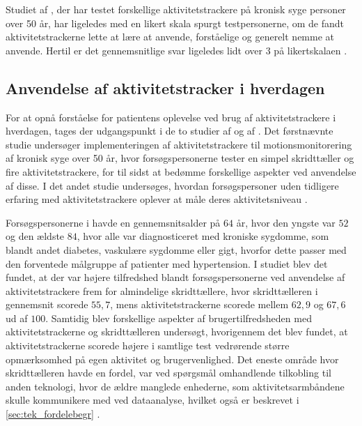 Studiet af \citeauthor{mercer2016}, der har testet forskellige aktivitetstrackere på kronisk syge personer over 50 år, har ligeledes med en likert skala spurgt testpersonerne, om de fandt aktivitetstrackerne lette at lære at anvende, forståelige og generelt nemme at anvende. Hertil er det gennemsnitlige svar ligeledes lidt over 3 på likertskalaen \citep{mercer2016}. 

\subsection{Anvendelse af aktivitetstracker i hverdagen} \label{sec:anvendelse}

For at opnå forståelse for patientens oplevelse ved brug af aktivitetstrackere i hverdagen, tages der udgangspunkt i de to studier  af \citeauthor{mercer2016} og  af \citeauthor{rapp2016}. Det førstnævnte studie undersøger implementeringen af aktivitetstrackere til motionsmonitorering af kronisk syge over 50 år, hvor forsøgspersonerne tester en simpel skridttæller og fire aktivitetstrackere, for til sidst at bedømme forskellige aspekter ved anvendelse af disse. I det andet studie undersøges, hvordan forsøgspersoner uden tidligere erfaring med aktivitetstrackere oplever at måle deres aktivitetsniveau \citep{mercer2016, rapp2016}.

Forsøgspersonerne i \citeauthor{mercer2016} havde en gennemsnitsalder på $64$ år, hvor den yngste var $52$ og den ældste $84$, hvor alle var diagnosticeret med kroniske sygdomme, som blandt andet diabetes, vaskulære sygdomme eller gigt, hvorfor dette passer med den forventede målgruppe af patienter med hypertension. I studiet blev det fundet, at der var højere tilfredshed blandt forsøgspersonerne ved anvendelse af aktivitetstrackere frem for almindelige skridttællere, hvor skridttælleren i gennemsnit scorede $55,7$, mens aktivitetstrackerne scorede mellem $62,9$ og $67,6$ ud af $100$. Samtidig blev forskellige aspekter af brugertilfredsheden med aktivitetstrackerne og skridttælleren undersøgt, hvorigennem det blev fundet, at aktivitetstrackerne scorede højere i samtlige test vedrørende større opmærksomhed på egen aktivitet og brugervenlighed. Det eneste område hvor skridttælleren havde en fordel, var ved spørgsmål omhandlende tilkobling til anden teknologi, hvor de ældre manglede enhederne, som aktivitetsarmbåndene skulle kommunikere med ved dataanalyse, hvilket også er beskrevet i \autoref{sec:tek_fordelebegr} \citep{mercer2016}.


